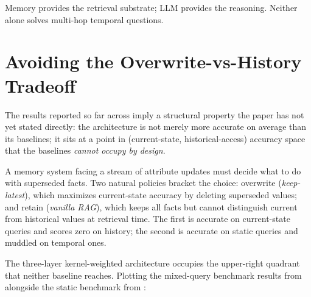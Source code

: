 \documentclass[11pt]{article}
\theoremstyle{plain}
\theoremstyle{definition}
\begin{document}
Memory provides the retrieval substrate; LLM provides
the reasoning.  Neither alone solves multi-hop
temporal questions.


\section{Avoiding the Overwrite-vs-History
Tradeoff}\label{sec:pareto}

The results reported so far across
 imply a structural
property the paper has not yet stated directly: the
architecture is not merely more accurate on average
than its baselines; it sits at a point in
(current-state, historical-access) accuracy space
that the baselines \emph{cannot occupy by design}.

A memory system facing a stream of attribute updates
must decide what to do with superseded facts.  Two
natural policies bracket the choice: overwrite
(\emph{keep-latest}), which maximizes current-state
accuracy by deleting superseded values; and retain
(\emph{vanilla RAG}), which keeps all facts but
cannot distinguish current from historical values
at retrieval time.  The first is accurate on
current-state queries and scores zero on history;
the second is accurate on static queries and muddled
on temporal ones.

The three-layer kernel-weighted architecture
occupies the upper-right quadrant that neither
baseline reaches.  Plotting the mixed-query
benchmark results from
 alongside the static
benchmark from :
\end{document}
